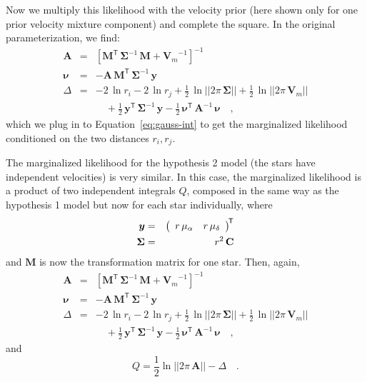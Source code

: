 \documentclass[manuscript, letterpaper]{aastex6}
\newcommand{\eqname}{Equation}
\newcommand{\transp}[1]{{#1}^{\!\mathsf{T}}}
\newcommand{\inv}[1]{{#1}^{-1}}
\newcommand{\bs}[1]{\boldsymbol{#1}}
\newcommand{\mat}[1]{\mathbf{#1}}
\renewcommand{\vec}[1]{\bs{#1}}
\begin{document}
Now we multiply this likelihood with the velocity prior (here shown only for one
prior velocity mixture component) and complete the square.
In the original parameterization, we find:
\begin{eqnarray}
  \mat{A} &=& \inv{[\transp{\mat{M}}\,\inv{\mat{\Sigma}}\,\mat{M}+\inv{\mat{V}_m}]}
  \\
  \vec{\nu} &=& -\mat{A}\,\transp{\mat{M}}\,\inv{\mat{\Sigma}}\,\vec{y}
  \\
  \Delta &=& -2\,\ln r_i -2\,\ln r_j
    +\frac{1}{2}\,\ln||2\pi\,\mat{\Sigma}|| +\frac{1}{2}\,\ln||2\pi\,\mat{V}_m|| \nonumber \\
    && \quad +\frac{1}{2}\,\transp{\vec{y}}\,\inv{\mat{\Sigma}}\,\vec{y} -\frac{1}{2}\,\transp{\vec{\nu}}\,\inv{\mat{A}}\,\vec{\nu}
  \quad ,
\end{eqnarray}
which we plug in to \eqname~\ref{eq:gauss-int} to get the marginalized
likelihood conditioned on the two distances $r_i, r_j$.

The marginalized likelihood for the hypothesis 2 model (the stars have
independent velocities) is very similar.
In this case, the marginalized likelihood is a product of two independent
integrals $Q$, composed in the same way as the hypothesis 1 model but now for
each star individually, where
\begin{eqnarray}
  \vec{y} &=&
    \transp{\left(
      \begin{array}{c c}
        r\,\mu_{\alpha} &
        r\,\mu_{\delta}
      \end{array}
    \right)}
  \\
  \mat{\Sigma} &=& r^2 \, \mat{C}
  \\
\end{eqnarray}
and $\mat{M}$ is now the transformation matrix for one star. Then, again,
\begin{eqnarray}
  \mat{A} &=& \inv{[\transp{\mat{M}}\,\inv{\mat{\Sigma}}\,\mat{M}+\inv{\mat{V}_m}]}
  \\
  \vec{\nu} &=& -\mat{A}\,\transp{\mat{M}}\,\inv{\mat{\Sigma}}\,\vec{y}
  \\
  \Delta &=& -2\,\ln r_i -2\,\ln r_j
    +\frac{1}{2}\,\ln||2\pi\,\mat{\Sigma}|| +\frac{1}{2}\,\ln||2\pi\,\mat{V}_m|| \nonumber \\
    && \quad +\frac{1}{2}\,\transp{\vec{y}}\,\inv{\mat{\Sigma}}\,\vec{y} -\frac{1}{2}\,\transp{\vec{\nu}}\,\inv{\mat{A}}\,\vec{\nu}
  \quad ,
\end{eqnarray}
and
\begin{equation}
  Q = \frac{1}{2}\ln ||2\pi\,\mat{A}|| -\Delta \quad .
\end{equation}
\end{document}
